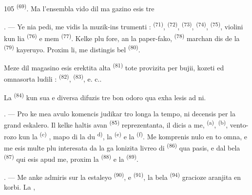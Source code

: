 \begin{VUpage}[107]{105}
\VUcontinue
{} \textsuperscript{(69)}. Ma l'ensembla vido dil ma\cc
gazino esis tre 

. --- Ye nia pedi, me vidis la muzik-ins\cc
trumenti :  \textsuperscript{(71)},  \textsuperscript{(72)},  \textsuperscript{(73)},\nl
{} \textsuperscript{(74)},  \textsuperscript{(75)}, violini kun\nl
lia  \textsuperscript{(76)} e mem  \textsuperscript{(77)}. Kelke plu\nl
fore, an la paper-fako,  \textsuperscript{(78)} marchan\cc
dis de la  \textsuperscript{(79)} kayeruyo. Proxim li, me\nl
distingis bel  \textsuperscript{(80)}.

\VUblancAlinea
Meze dil magasino esis erektita alta \cc
{} \textsuperscript{(81)} tote provizita per bujii, kozeti\nl
ed omnasorta ludili :  \textsuperscript{(82)},  \textsuperscript{(83)},\nl
e. c..

\VUblancAlinea
La  \textsuperscript{(84)} kun sua  e\nl
diversa  difuzis tre bon odoro qua exha\cc
lesis ad ni.

\VUsaut{3.4mm}
\VUsaut{2.8mm}

. --- Pro ke mea avulo komencis judikar\nl
tro longa la tempo, ni decensis per la grand\nl
eskalero. Il kelke haltis avan \cc
{} \textsuperscript{(85)} reprezentanta, il dicis a me,  \textsuperscript{(a)},\nl
{} \textsuperscript{(b)}, vento-rozo kun la \nl
{} \textsuperscript{(c)} \cc
{}, mapo di la du  \textsuperscript{d)}, la  \textsuperscript{(e)} e la\nl
{} \textsuperscript{(f)}. Me komprenis nulo en to\nl
omna, e me esis multe plu interesata da la ga\cc
lonizita livreo di  \textsuperscript{(86)} qua pasis,\nl
e dal bela  \textsuperscript{(87)} qui esis apud me,\nl
proxim la  \textsuperscript{(88)} e la  \textsuperscript{(89)}.

. --- Me anke admiris sur la estaleyo \cc
{} \textsuperscript{(90)}, e  \textsuperscript{(91)}, la bela \cc
{} \textsuperscript{(94)} gracioze aranjita en korbi. La , \ccplein
\end{VUpage}

